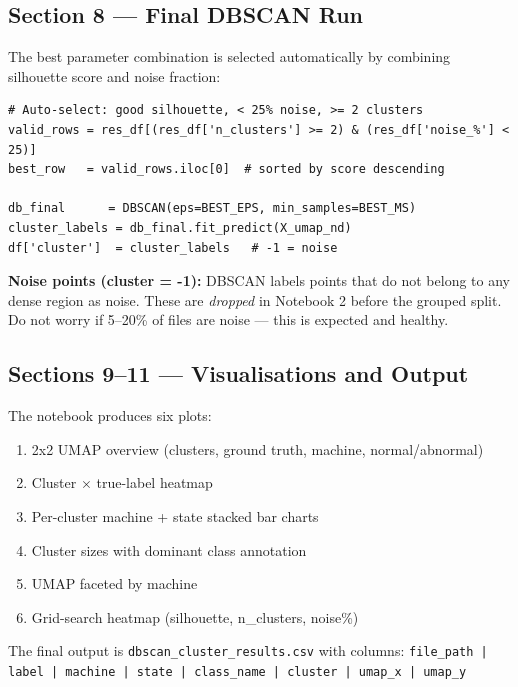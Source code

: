\documentclass[12pt,a4paper]{article}
\begin{document}
\subsection{Section 8 --- Final DBSCAN Run}

The best parameter combination is selected automatically by combining silhouette score and noise fraction:

\begin{lstlisting}
# Auto-select: good silhouette, < 25% noise, >= 2 clusters
valid_rows = res_df[(res_df['n_clusters'] >= 2) & (res_df['noise_%'] < 25)]
best_row   = valid_rows.iloc[0]  # sorted by score descending

db_final      = DBSCAN(eps=BEST_EPS, min_samples=BEST_MS)
cluster_labels = db_final.fit_predict(X_umap_nd)
df['cluster']  = cluster_labels   # -1 = noise
\end{lstlisting}

\begin{warningbox}
\textbf{Noise points (cluster = -1):} DBSCAN labels points that do not belong to any dense region as noise. These are \textit{dropped} in Notebook 2 before the grouped split. Do not worry if 5--20\% of files are noise --- this is expected and healthy.
\end{warningbox}

\subsection{Sections 9--11 --- Visualisations and Output}

The notebook produces six plots:
\begin{enumerate}[nosep]
  \item 2x2 UMAP overview (clusters, ground truth, machine, normal/abnormal)
  \item Cluster $\times$ true-label heatmap
  \item Per-cluster machine + state stacked bar charts
  \item Cluster sizes with dominant class annotation
  \item UMAP faceted by machine
  \item Grid-search heatmap (silhouette, n\_clusters, noise\%)
\end{enumerate}

The final output is \texttt{dbscan\_cluster\_results.csv} with columns:
\texttt{file\_path | label | machine | state | class\_name | cluster | umap\_x | umap\_y}


\end{document}
